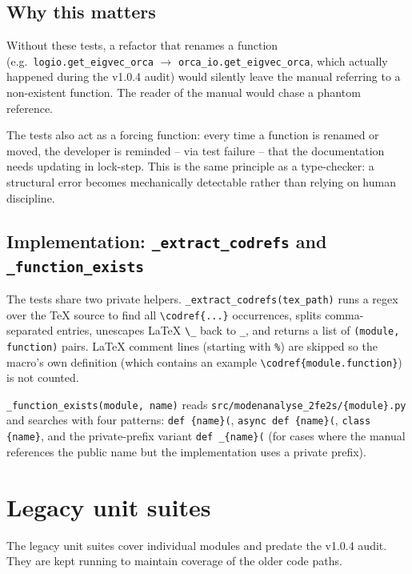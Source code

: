 \documentclass[10pt,a4paper,twoside]{article}
\newcommand{\fn}[1]{\texttt{#1}}
\newcommand{\file}[1]{\texttt{#1}}
\begin{document}
\subsection{Why this matters}

Without these tests, a refactor that renames a function (e.g.\
\texttt{logio.get\_eigvec\_orca} $\rightarrow$
\texttt{orca\_io.get\_eigvec\_orca}, which actually happened during
the v1.0.4 audit) would silently leave the manual referring to a
non-existent function. The reader of the manual would chase a
phantom reference.

The tests also act as a forcing function: every time a function is
renamed or moved, the developer is reminded -- via test failure --
that the documentation needs updating in lock-step. This is the
same principle as a type-checker: a structural error becomes
mechanically detectable rather than relying on human discipline.

\subsection{Implementation: \fn{\_extract\_codrefs} and \fn{\_function\_exists}}

The tests share two private helpers. \fn{\_extract\_codrefs(tex\_path)}
runs a regex over the TeX source to find all
\texttt{\textbackslash codref\{...\}} occurrences, splits comma-
separated entries, unescapes LaTeX \texttt{\textbackslash\_} back to
\texttt{\_}, and returns a list of \texttt{(module, function)}
pairs. LaTeX comment lines (starting with \texttt{\%}) are skipped
so the macro's own definition (which contains an example
\texttt{\textbackslash codref\{module.function\}}) is not counted.

\fn{\_function\_exists(module, name)} reads
\file{src/modenanalyse\_2fe2s/\{module\}.py} and searches with four
patterns: \texttt{def \{name\}(}, \texttt{async def \{name\}(},
\texttt{class \{name\}}, and the private-prefix variant
\texttt{def \_\{name\}(} (for cases where the manual references the
public name but the implementation uses a private prefix).

\section{Legacy unit suites}

The legacy unit suites cover individual modules and predate the
v1.0.4 audit. They are kept running to maintain coverage of the
older code paths.
\end{document}
